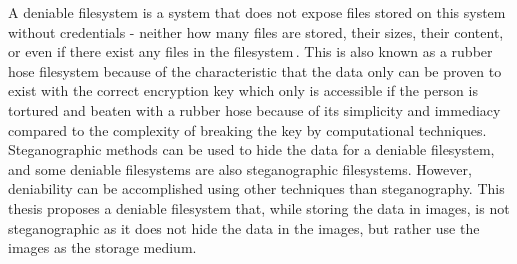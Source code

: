 \label{sec:rubber_hose}
A deniable filesystem is a system that does not expose files stored on this system without credentials - neither how many files are stored, their sizes, their content, or even if there exist any files in the filesystem\,\cite{andersonSteganographicFileSystem1998}. This is also known as a rubber hose filesystem because of the characteristic that the data only can be proven to exist with the correct encryption key which only is accessible if the person is tortured and beaten with a rubber hose because of its simplicity and immediacy compared to the complexity of breaking the key by computational techniques. Steganographic methods can be used to hide the data for a deniable filesystem, and some deniable filesystems are also steganographic filesystems. However, deniability can be accomplished using other techniques than steganography. This thesis proposes a deniable filesystem that, while storing the data in images, is not steganographic as it does not hide the data in the images, but rather use the images as the storage medium.